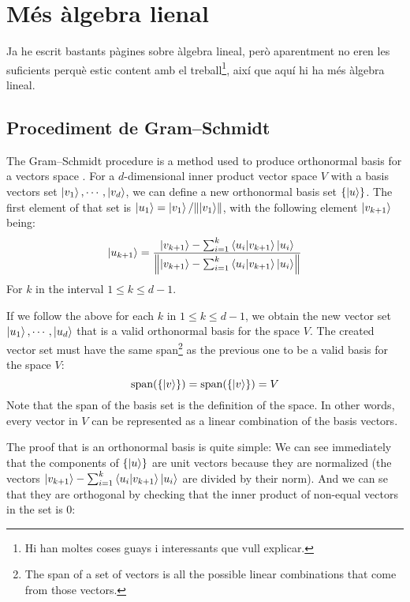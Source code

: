 \chapter{Més àlgebra lienal}
Ja he escrit bastants pàgines sobre àlgebra lineal, però aparentment no eren les suficients perquè estic content amb el treball\footnote{Hi han moltes coses guays i interessants que vull explicar.}, així que aquí hi ha més àlgebra lineal.


\section{Procediment de Gram–Schmidt}\label{gram}
The Gram–Schmidt procedure is a method used to produce orthonormal basis for a vectors space \cite{QCandQI:GramSchmidt}. For a $d$-dimensional inner product vector space $V$ with a basis vectors set $\ket{v_1}, \cdots, \ket{v_d}$, we can define a new orthonormal basis set $\{\ket{u}\}$. The first element of that set is $\ket{u_1} = \ket{v_1}/\norm{\ket{v_1}}$, with the following element $\ket{v_{k+1}}$  being:
$$
\ket{u_{k+1}} = \frac{\ket{v_{k+1}} - \sum_{i=1}^{k} \bra{u_i}\ket{v_{k+1}}\ket{u_i}}{\norm{\ket{v_{k+1}} - \sum_{i=1}^{k} \bra{u_i}\ket{v_{k+1}}\ket{u_i}}}
$$
For $k$ in the interval $1 \leq k \leq d-1$.

If we follow the above for each $k$ in $1 \leq k \leq d-1$, we obtain the new vector set $\ket{u_1}, \cdots , \ket{u_d}$ that is a valid orthonormal basis for the space $V$. The created vector set must have the same span\footnote{The span of a set of vectors is all the possible linear combinations that come from those vectors.} as the previous one to be a valid basis for the space $V$:
$$
\text{span}(\{\ket{v}\}) = \text{span}(\{\ket{v}\}) = V
$$
Note that the span of the basis set is the definition of the space. In other words, every vector in $V$ can be represented as a linear combination of the basis vectors. 

The proof that is an orthonormal basis is quite simple: 
We can see immediately that the components of $\{ \ket{u} \}$ are unit vectors because they are normalized (the vectors $\ket{v_{k+1}} - \sum_{i=1}^{k} \bra{u_i}\ket{v_{k+1}}\ket{u_i}$ are divided by their norm). And we can se that they are orthogonal by checking that the inner product of non-equal vectors in the set is 0: 

